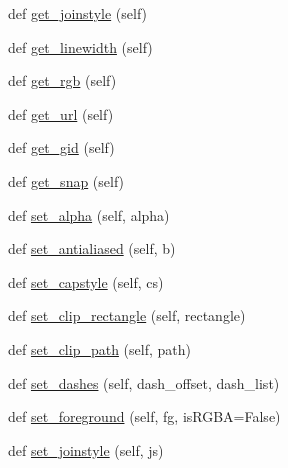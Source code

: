 \begin{DoxyCompactItemize}
\item 
def \hyperlink{classmatplotlib_1_1backend__bases_1_1GraphicsContextBase_a129556955c58845b36663dc1f5bd63c2}{get\+\_\+joinstyle} (self)
\item 
def \hyperlink{classmatplotlib_1_1backend__bases_1_1GraphicsContextBase_aa71946ea3d84411072515c7675442103}{get\+\_\+linewidth} (self)
\item 
def \hyperlink{classmatplotlib_1_1backend__bases_1_1GraphicsContextBase_a1c8b86cd025ad8e2c7c658029fe9a627}{get\+\_\+rgb} (self)
\item 
def \hyperlink{classmatplotlib_1_1backend__bases_1_1GraphicsContextBase_af3eb5ab2cc68479cf02576639d09b382}{get\+\_\+url} (self)
\item 
def \hyperlink{classmatplotlib_1_1backend__bases_1_1GraphicsContextBase_ab08f7bf6fd3356e2e97560bed85f9411}{get\+\_\+gid} (self)
\item 
def \hyperlink{classmatplotlib_1_1backend__bases_1_1GraphicsContextBase_a61d8ce359998f583502cbc32676084dc}{get\+\_\+snap} (self)
\item 
def \hyperlink{classmatplotlib_1_1backend__bases_1_1GraphicsContextBase_a14995bf596e720d5cf8423349e73560b}{set\+\_\+alpha} (self, alpha)
\item 
def \hyperlink{classmatplotlib_1_1backend__bases_1_1GraphicsContextBase_ab1026795889d69454aa6ca65608ad11a}{set\+\_\+antialiased} (self, b)
\item 
def \hyperlink{classmatplotlib_1_1backend__bases_1_1GraphicsContextBase_a2c18300f4f79a13b2183be50572c4dcb}{set\+\_\+capstyle} (self, cs)
\item 
def \hyperlink{classmatplotlib_1_1backend__bases_1_1GraphicsContextBase_a1fcc3a8fcf785b6b3bb02d6f0b6dea5a}{set\+\_\+clip\+\_\+rectangle} (self, rectangle)
\item 
def \hyperlink{classmatplotlib_1_1backend__bases_1_1GraphicsContextBase_a14f094188084a121278eaa2af07c2cee}{set\+\_\+clip\+\_\+path} (self, path)
\item 
def \hyperlink{classmatplotlib_1_1backend__bases_1_1GraphicsContextBase_a39cd59c5f7f6c3d04fccb2b00af44a96}{set\+\_\+dashes} (self, dash\+\_\+offset, dash\+\_\+list)
\item 
def \hyperlink{classmatplotlib_1_1backend__bases_1_1GraphicsContextBase_a5f439cffb7b5b063102decf539930483}{set\+\_\+foreground} (self, fg, is\+R\+G\+BA=False)
\item 
def \hyperlink{classmatplotlib_1_1backend__bases_1_1GraphicsContextBase_a8e142a9a8087e81477da47c3795f326a}{set\+\_\+joinstyle} (self, js)

\end{DoxyCompactItemize}
